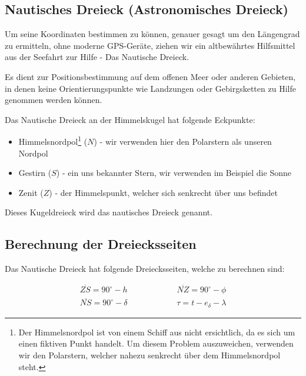 \begin{refsection}
\section{Nautisches Dreieck (Astronomisches Dreieck)}
Um seine Koordinaten bestimmen zu können, genauer gesagt um den Längengrad zu ermitteln, ohne moderne GPS-Geräte, ziehen wir ein altbewährtes Hilfsmittel aus der Seefahrt zur Hilfe - Das Nautische Dreieck.

Es dient zur Positionsbestimmung auf dem offenen Meer oder anderen Gebieten, in denen keine Orientierungspunkte wie Landzungen oder Gebirgsketten zu Hilfe genommen werden können.

Das Nautische Dreieck an der Himmelskugel hat folgende Eckpunkte:
\begin{itemize}
\item Himmelsnordpol\footnote{%
Der Himmelsnordpol ist von einem Schiff aus nicht ersichtlich, da es sich um einen fiktiven Punkt handelt. Um diesem Problem auszuweichen, verwenden wir den Polarstern, welcher nahezu senkrecht über dem Himmelsnordpol steht.}
 ($N$) - wir verwenden hier den Polarstern als unseren Nordpol
\item Gestirn ($S$) - ein uns bekannter Stern, wir verwenden im Beispiel die Sonne
\item Zenit ($Z$) - der Himmelspunkt, welcher sich senkrecht über uns befindet
\end{itemize}

Dieses Kugeldreieck wird das nautisches Dreieck genannt.


\subsection{Berechnung der Dreiecksseiten}
Das Nautische Dreieck hat folgende Dreiecksseiten, welche zu berechnen sind:

\begin{align*}
\overline{ZS} = 90^{\circ} - h \quad \quad \quad \quad \quad \quad 
\overline{NZ} = 90^{\circ} - \phi \\
\overline{NS} = 90^{\circ} - \delta \quad \quad \quad \quad \quad \quad 
\tau = t - e_\delta - \lambda 
\end{align*}



\end{refsection}
